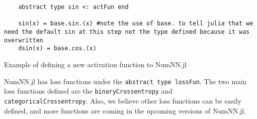 \begin{listing}[H]
	\begin{verbatim}
	abstract type sin <: actFun end
	
	sin(x) = base.sin.(x) #note the use of base. to tell julia that we need the default sin at this step not the type defined because it was overwritten
	dsin(x) = base.cos.(x)
	\end{verbatim}
	\caption{Example of defining a new activation function to NumNN.jl}
\end{listing}

NumNN.jl has loss functions under the \texttt{abstract type lossFun}. The two main loss functions defined are the \texttt{binaryCrossentropy} and \texttt{categoricalCrossentropy}. Also, we believe other loss functions can be easily defined, and more functions are coming in the upcoming versions of NumNN.jl.


